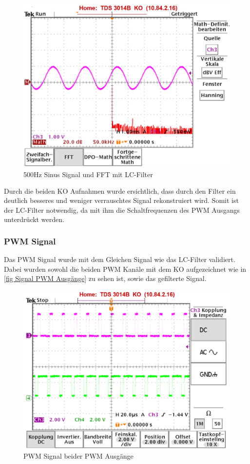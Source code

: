 \begin{figure}
\center
\includegraphics[scale=1.0]{data/500Hz_Sin_mit_Filter_FFT.png}
\caption{500Hz Sinus Signal und FFT mit LC-Filter}
\label{fig:500Hz mit Filter}
\end{figure}

Durch die beiden KO Aufnahmen wurde ersichtlich, dass durch den Filter ein deutlich besseres und weniger verrauschtes Signal rekonstruiert wird. Somit ist der LC-Filter notwendig, da mit ihm die Schaltfrequenzen des PWM Ausgangs unterdrückt werden.


\newpage
\subsubsection{PWM Signal}\label{sec: Validierung PWM Signal}
Das PWM Signal wurde mit dem Gleichen Signal wie das LC-Filter validiert. Dabei wurden sowohl die beiden PWM Kanäle mit dem KO aufgezeichnet wie in \autoref{fig Signal PWM Ausgänge} zu sehen ist, sowie das gefilterte Signal. 

\begin{figure}[ht!]
\center
\includegraphics[scale=1.0]{data/PWM_Signal_500Hz_Mono_mit_Infos.png}
\caption{PWM Signal beider PWM Ausgänge}
\label{fig:Signal PWM Ausgänge}
\end{figure}

